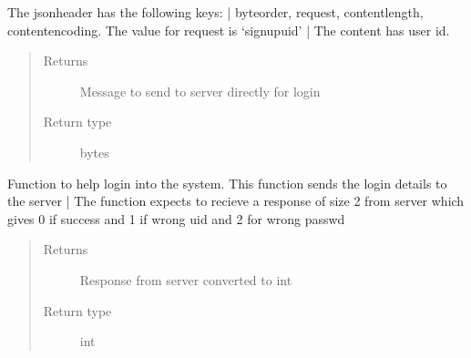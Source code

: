 \documentclass[letterpaper,10pt,english]{sphinxmanual}
\begin{document}
\begin{fulllineitems}
\begin{fulllineitems}
\begin{quote}
\begin{description}
\end{description}\end{quote}

\end{fulllineitems}


\begin{fulllineitems}
\label{\detokenize{Message:Message.Message._create_signupuid_request}}
The jsonheader has the following keys: |
byteorder, request, content\sphinxhyphen{}length, content\sphinxhyphen{}encoding. The value for request is ‘signupuid’ |
The content has user id.
\begin{quote}\begin{description}
\item[{Returns}] \leavevmode
Message to send to server directly for login

\item[{Return type}] \leavevmode
bytes

\end{description}\end{quote}

\end{fulllineitems}


\begin{fulllineitems}
\label{\detokenize{Message:Message.Message._login}}
Function to help login into the system. This function sends the login details to the server |
The function expects to recieve a response of size 2 from server which gives 0 if success and 1 if wrong uid and 2 for wrong passwd
\begin{quote}\begin{description}
\item[{Returns}] \leavevmode
Response from server converted to int

\item[{Return type}] \leavevmode
int

\end{description}\end{quote}

\end{fulllineitems}


\end{fulllineitems}
\end{document}
